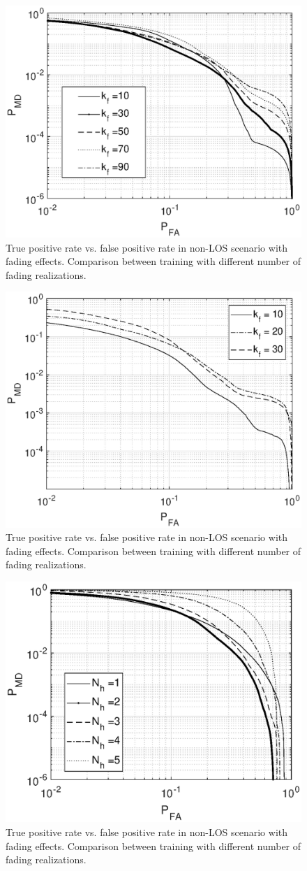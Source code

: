 \documentclass[draftcls,onecolumn,12pt]{IEEEtran}
\begin{document}
\begin{figure}
    \centering
    \includegraphics[width=0.5\columnwidth]{res_avg_nFading.eps}
    \caption{True positive rate vs. false positive rate in non-LOS scenario with fading effects. Comparison between training with different number of fading realizations.}
    \label{fig:faded}
\end{figure}

\begin{figure}
    \centering
    \includegraphics[width=0.5\columnwidth]{res_avg_nFading_SVM.eps}
    \caption{True positive rate vs. false positive rate in non-LOS scenario with fading effects. Comparison between training with different number of fading realizations.}
    \label{fig:faded}
\end{figure}

\begin{figure}
    \centering
    \includegraphics[width=0.5\columnwidth]{res_ae_onNeur.eps}
    \caption{True positive rate vs. false positive rate in non-LOS scenario with fading effects. Comparison between training with different number of fading realizations.}
    \label{fig:faded}
\end{figure}
\end{document}
